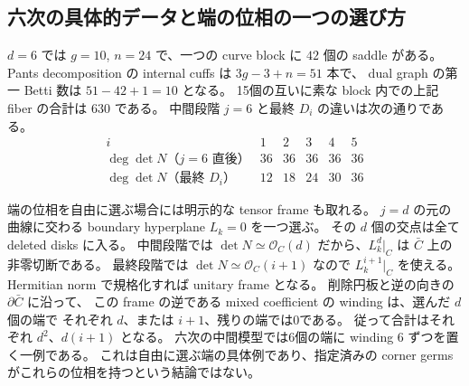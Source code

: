 \subsection{六次の具体的データと端の位相の一つの選び方}

$d=6$ では $g=10$, $n=24$ で、一つの curve block に $42$ 個の saddle がある。
Pants decomposition の internal cuffs は $3g-3+n=51$ 本で、
dual graph の第一 Betti 数は $51-42+1=10$ となる。
15個の互いに素な block 内での上記 fiber の合計は $630$ である。
中間段階 $j=6$ と最終 $D_i$ の違いは次の通りである。
\[
\begin{array}{c|ccccc}
i&1&2&3&4&5\\ \hline
\deg\det N\text{（$j=6$ 直後）}&36&36&36&36&36\\
\deg\det N\text{（最終 $D_i$）}&12&18&24&30&36
\end{array}
\]

端の位相を自由に選ぶ場合には明示的な tensor frame も取れる。
$j=d$ の元の曲線に交わる boundary hyperplane $L_k=0$ を一つ選ぶ。
その $d$ 個の交点は全て deleted disks に入る。
中間段階では
$\det N\simeq\mathcal O_C(d)$ だから、$L_k^d|_C$ は $\bar C$ 上の非零切断である。
最終段階では $\det N\simeq\mathcal O_C(i+1)$ なので $L_k^{i+1}|_C$ を使える。
Hermitian norm で規格化すれば unitary frame となる。
削除円板と逆の向きの $\partial\bar C$ に沿って、
この frame の逆である mixed coefficient の winding は、選んだ $d$ 個の端で
それぞれ $d$、または $i+1$、残りの端では0である。
従って合計はそれぞれ $d^2$、$d(i+1)$ となる。
六次の中間模型では6個の端に winding $6$ ずつを置く一例である。
これは自由に選ぶ端の具体例であり、指定済みの corner germs がこれらの位相を持つという結論ではない。
